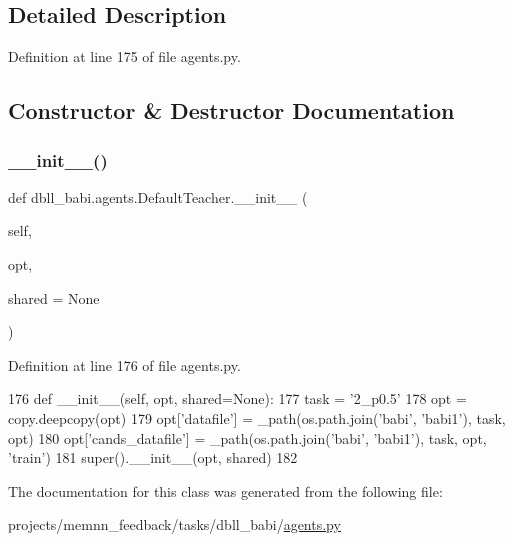 \subsection{Detailed Description}


Definition at line 175 of file agents.\+py.



\subsection{Constructor \& Destructor Documentation}
\mbox{\label{classdbll__babi_1_1agents_1_1DefaultTeacher_a85fccd548f577a173a3497a5bd6d0e53}} 
\subsubsection{\texorpdfstring{\+\_\+\+\_\+init\+\_\+\+\_\+()}{\_\_init\_\_()}}
{\footnotesize\ttfamily def dbll\+\_\+babi.\+agents.\+Default\+Teacher.\+\_\+\+\_\+init\+\_\+\+\_\+ (\begin{DoxyParamCaption}\item[{}]{self,  }\item[{}]{opt,  }\item[{}]{shared = {\ttfamily None} }\end{DoxyParamCaption})}



Definition at line 176 of file agents.\+py.


\begin{DoxyCode}
176     \textcolor{keyword}{def }\_\_init\_\_(self, opt, shared=None):
177         task = \textcolor{stringliteral}{'2\_p0.5'}
178         opt = copy.deepcopy(opt)
179         opt[\textcolor{stringliteral}{'datafile'}] = \_path(os.path.join(\textcolor{stringliteral}{'babi'}, \textcolor{stringliteral}{'babi1'}), task, opt)
180         opt[\textcolor{stringliteral}{'cands\_datafile'}] = \_path(os.path.join(\textcolor{stringliteral}{'babi'}, \textcolor{stringliteral}{'babi1'}), task, opt, \textcolor{stringliteral}{'train'})
181         super().\_\_init\_\_(opt, shared)
182 \end{DoxyCode}


The documentation for this class was generated from the following file\+:\begin{DoxyCompactItemize}
\item 
projects/memnn\+\_\+feedback/tasks/dbll\+\_\+babi/\hyperlink{projects_2memnn__feedback_2tasks_2dbll__babi_2agents_8py}{agents.\+py}\end{DoxyCompactItemize}
